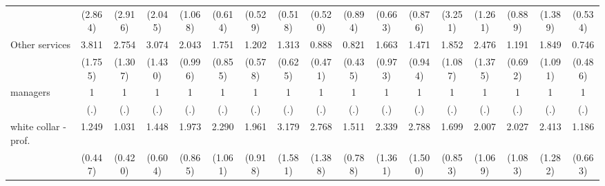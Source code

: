 {\begin{tabular}{l*{16}{c}}
                    &     (2.864)         &     (2.916)         &     (2.045)         &     (1.068)         &     (0.614)         &     (0.529)         &     (0.518)         &     (0.520)         &     (0.894)         &     (0.663)         &     (0.876)         &     (3.251)         &     (1.261)         &     (0.889)         &     (1.389)         &     (0.534)         \\
[1em]
Other services      &       3.811\sym{**} &       2.754\sym{*}  &       3.074\sym{*}  &       2.043         &       1.751         &       1.202         &       1.313         &       0.888         &       0.821         &       1.663         &       1.471         &       1.852         &       2.476         &       1.191         &       1.849         &       0.746         \\
                    &     (1.755)         &     (1.307)         &     (1.430)         &     (0.996)         &     (0.855)         &     (0.578)         &     (0.625)         &     (0.471)         &     (0.435)         &     (0.973)         &     (0.944)         &     (1.087)         &     (1.375)         &     (0.692)         &     (1.091)         &     (0.486)         \\
[1em]
managers            &           1         &           1         &           1         &           1         &           1         &           1         &           1         &           1         &           1         &           1         &           1         &           1         &           1         &           1         &           1         &           1         \\
                    &         (.)         &         (.)         &         (.)         &         (.)         &         (.)         &         (.)         &         (.)         &         (.)         &         (.)         &         (.)         &         (.)         &         (.)         &         (.)         &         (.)         &         (.)         &         (.)         \\
[1em]
white collar - prof.&       1.249         &       1.031         &       1.448         &       1.973         &       2.290         &       1.961         &       3.179\sym{*}  &       2.768\sym{*}  &       1.511         &       2.339         &       2.788         &       1.699         &       2.007         &       2.027         &       2.413         &       1.186         \\
                    &     (0.447)         &     (0.420)         &     (0.604)         &     (0.865)         &     (1.061)         &     (0.918)         &     (1.581)         &     (1.388)         &     (0.788)         &     (1.361)         &     (1.500)         &     (0.853)         &     (1.069)         &     (1.083)         &     (1.282)         &     (0.663)         \\

\end{tabular}}
